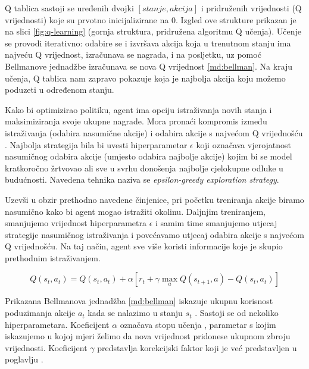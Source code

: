 Q tablica sastoji se uređenih dvojki $[stanje, akcija]$ i pridruženih vrijednosti (Q vrijednosti) koje su prvotno inicijalizirane na $0$. Izgled ove strukture prikazan je na slici \ref{fig:q-learning} (gornja struktura, pridružena algoritmu Q učenja). Učenje se provodi iterativno: odabire se i izvršava akcija koja u trenutnom stanju ima najveću Q vrijednost, izračunava se nagrada, i na posljetku, uz pomoć Bellmanove jednadžbe izračunava se nova Q vrijednost \ref{md:bellman}. Na kraju učenja, Q tablica nam zapravo pokazuje koja je najbolja akcija koju možemo poduzeti u određenom stanju.

Kako bi optimizirao politiku, agent ima opciju istraživanja novih stanja i maksimiziranja svoje ukupne nagrade. Mora pronaći kompromis između istraživanja (odabira nasumične akcije)  i odabira akcije s najvećom Q vrijednošću  \cite{QL}. Najbolja strategija bila bi uvesti hiperparametar $\epsilon$ koji označava vjerojatnost nasumičnog odabira akcije (umjesto odabira najbolje akcije) kojim bi se model kratkoročno žrtvovao ali sve u svrhu donošenja najbolje cjelokupne odluke u budućnosti. Navedena tehnika naziva se \textit{epsilon-greedy exploration strategy}.

Uzevši u obzir prethodno navedene činjenice, pri početku treniranja akcije biramo nasumično kako bi agent mogao istražiti okolinu. Daljnjim treniranjem, smanjujemo vrijednost hiperparametra $\epsilon$ i samim time smanjujemo utjecaj strategije nasumičnog istraživanja i povećavamo utjecaj odabira akcije s najvećom Q vrijednošću. Na taj način, agent sve više koristi informacije koje je skupio prethodnim istraživanjem. 

\begin{equation}
    \label{md:bellman}
    Q(s_t, a_t) = Q(s_t, a_t) + \alpha \left[ r_t + \gamma \max_a Q(s_{t+1}, a) - Q(s_t, a_t) \right]
\end{equation}

\bigskip

Prikazana Bellmanova jednadžba \ref{md:bellman} iskazuje ukupnu korisnost poduzimanja akcije $a_t$ kada se nalazimo u stanju $s_t$ \cite{PodUceFer}. Sastoji se od nekoliko hiperparametara. Koeficijent $\alpha$ označava stopu učenja , parametar s kojim iskazujemo u kojoj mjeri želimo da nova vrijednost pridonese ukupnom zbroju vrijednosti. Koeficijent $\gamma$ predstavlja korekcijski faktor  koji je već predstavljen u poglavlju . 

